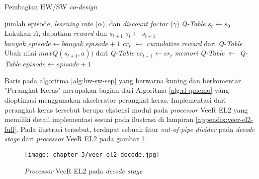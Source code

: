 \begin{algorithm}
	\makeatletter
	\renewcommand{\ALG@name}{Algoritma}
	\makeatother
	\caption{Pembagian HW/SW \textit{co-design}}\label{alg:hw-sw-sep}
	\renewcommand{\algorithmicrequire}{\textbf{Masukan:}}
	\renewcommand{\algorithmicensure}{\textbf{Keluaran:}}
	\begin{algorithmic}[1]
		\Require jumlah episode, \textit{learning rate} ($\alpha$), dan \textit{discount factor} ($\gamma$)
		\Ensure \textit{Q-Table}
		\State {}
		\State {}
		\State $s_{t} \gets s_0$
		\State {}
		\State Lakukan $A$, dapatkan \textit{reward} dan $s_{t+1}$
		\State {}
		\State {}
		\State $s_t \gets s_{t+1}$
		\EndWhile
		\State $banyak\_episode \gets banyak\_episode + 1$
		\State $cr_t$ $\gets$ \textit{cumulative reward} dari \textit{Q-Table}
		\State Ubah nilai $maxQ(s_{t+1},a))$ dari \textit{Q-Table}
		\EndIf
		\State $cr_{t-1} \gets cr_t$
		\State \textit{memori Q-Table} $\gets$ \textit{Q-Table}
		\State $episode \gets episode + 1$
		\EndWhile
	\end{algorithmic}
\end{algorithm}

Baris pada algoritma \ref{alg:hw-sw-sep} yang berwarna kuning dan berkomentar "Perangkat Keras" merupakan bagian dari Algoritma \ref{alg:rl-qmemo} yang dioptimasi menggunakan akselerator perangkat keras. Implementasi dari perangkat keras tersebut berupa ekstensi modul pada \textit{processor} VeeR EL2 yang memiliki detail implementasi sesuai pada ilustrasi di lampiran \ref{appendix:veer-el2-full}. Pada ilustrasi tersebut, terdapat sebuah fitur \textit{out-of-pipe divider} pada \textit{decode stage} dari \textit{processor} VeeR EL2 pada gambar \ref{fig:veer-el2-decode}.

\begin{figure}[H]
	\centering
	\texttt{[image: chapter-3/veer-el2-decode.jpg]}
	\caption{\textit{Processor} VeeR EL2 pada \textit{decode stage}}
	\label{fig:veer-el2-decode}
\end{figure}

